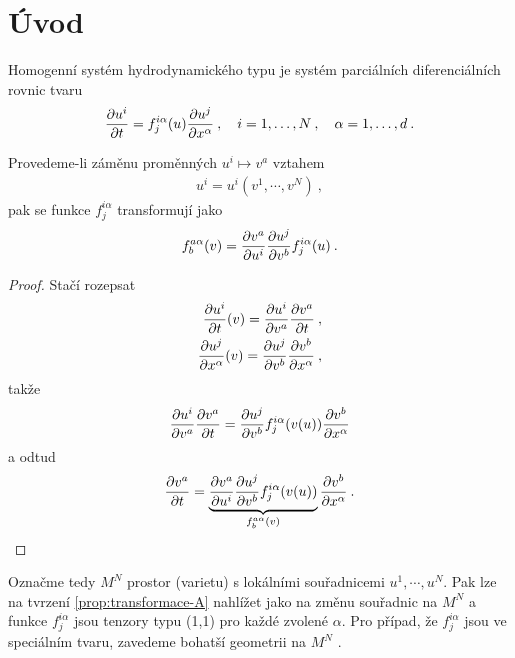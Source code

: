 \section{Úvod}

\begin{definition}
    Homogenní systém hydrodynamického typu je systém parciálních diferenciálních rovnic tvaru
    \begin{align}
        \frac{\partial u^i}{\partial t} = f_j^{i \alpha} (u) \frac{\partial u^j}{\partial x^\alpha} \:, \quad 
        i = 1, \dots , N \:, \quad \alpha = 1, \dots , d \:.
    \end{align}
\end{definition}

\begin{proposition} \label{prop:transformace-A} 
    Provedeme-li záměnu proměnných $u^i \mapsto v^a$ vztahem
    \begin{align}
        u^i = u^i(v^1,\cdots, v^N) \:,
    \end{align}
    pak se funkce $f^{i\alpha}_{j}$ transformují jako
    \begin{align}
        f^{a \alpha}_{b}(v) = \frac{\partial v^a}{\partial u^i} \frac{\partial u^j}{\partial v^b} f^{i \alpha}_j (u) \:.
    \end{align}
\end{proposition}
\begin{proof}
    Stačí rozepsat
    \begin{align}
        \frac{\partial u^i}{\partial t}(v) = \frac{\partial u^i}{\partial v^a} \frac{\partial v^a}{\partial t} \:, \\
        \frac{\partial u^j}{\partial x^\alpha}(v) = \frac{\partial u^j}{\partial v^b} \frac{\partial v^b}{\partial x^\alpha}\:,
    \end{align}
    takže
    \begin{align}
        \frac{\partial u^i}{\partial v^a} \frac{\partial v^a}{\partial t} = \frac{\partial u^j}{\partial v^b} f^{i \alpha}_j (v(u)) \frac{\partial v^b}{\partial x^\alpha}
    \end{align}
    a odtud
    \begin{align}
        \frac{\partial v^a}{\partial t} = \underbrace{\frac{\partial v^a}{\partial u^i} \frac{\partial u^j}{\partial v^b} f^{i \alpha}_j(v(u))}_{f^{a \alpha}_b(v)} \frac{\partial v^b}{\partial x^\alpha} \:.
    \end{align}
\end{proof}

Označme tedy $M^N$ prostor (varietu) s lokálními souřadnicemi $u^1,\cdots, u^N$. Pak lze na tvrzení \vref{prop:transformace-A} nahlížet jako na změnu souřadnic na $M^N$ a funkce $f^{i \alpha}_j$ jsou tenzory typu (1,1) pro každé zvolené $\alpha$. Pro případ, že $f^{i  \alpha}_j$ jsou ve speciálním tvaru, zavedeme bohatší geometrii na $M^N$ .

